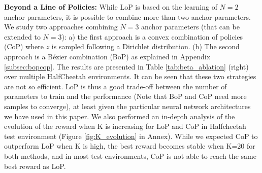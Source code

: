 \textbf{Beyond a Line of Policies: } While LoP is based on the learning of $N=2$ anchor parameters, it is possible to combine more than two anchor parameters. We study two approaches combining $N=3$ anchor parameters (that can be extended to $N=3$): a) the first approach is a convex combination of policies (CoP) where $z$ is sampled following a Dirichlet distribution. (b) The second approach is a Bézier combination (BoP) as explained in Appendix \ref{subsec:bopcop}. The results are presented in Table \ref{tab:beta_ablation} (right) over multiple HalfCheetah environments. It can be seen that these two strategies are not so efficient. LoP is thus a good trade-off between the number of parameters to train and the performance (Note that BoP and CoP need more samples to converge), at least given the particular neural network architectures we have used in this paper. We also performed an in-depth analysis of the evolution of the reward when K is increasing for LoP and CoP in Halfcheetah test environment (Figure \ref{fig:K_evolution} in Annex). While we expected CoP to outperform LoP when K is high, the best reward becomes stable when K=20 for both methods, and in most test environments, CoP is not able to reach the same best reward as LoP. %



